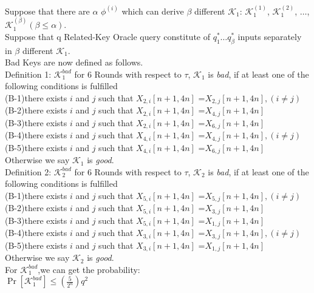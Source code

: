 \documentclass{article}
\begin{document}
Suppose that there are $\alpha$ $\phi^{(i)}$ which can derive $\beta$ different $\mathcal{K}_{1}$: $\mathcal{K}_{1}^{(1)}$, $\mathcal{K}_{1}^{(2)}$, $\dots$,$\mathcal{K}_{1}^{(\beta)}$$(\beta\leq \alpha)$.\\
Suppose that q Related-Key Oracle query constitute of $q_{1}^{\ast} \dots q_{\beta}^{\ast}$ inputs separately in $\beta$ different $\mathcal{K}_{1}$.\\

Bad Keys are now defined as follows.\\
Definition 1: $\mathcal{K}_{1}^{bad}$  for 6 Rounds
with respect to $\tau$, $\mathcal{K}_{1}$  is {\it bad}, if at least one of the following conditions is fulfilled\\
(B-1)there exists $i$ and $j$ such that $X_{2,i}[n+1,4n]$ =$X_{2,j}[n+1,4n],(i\neq j)$\\
(B-2)there exists $i$ and $j$ such that $X_{2,i}[n+1,4n]$ =$X_{4,j}[n+1,4n]$\\
(B-3)there exists $i$ and $j$ such that $X_{2,i}[n+1,4n]$ =$X_{6,j}[n+1,4n]$\\
(B-4)there exists $i$ and $j$ such that $X_{4,i}[n+1,4n]$ =$X_{4,j}[n+1,4n],(i\neq j)$\\
(B-5)there exists $i$ and $j$ such that $X_{4,i}[n+1,4n]$ =$X_{6,j}[n+1,4n]$\\
Otherwise we say $\mathcal{K}_{1}$ is {\it good}.\\

Definition 2: $\mathcal{K}_{2}^{bad}$  for 6 Rounds
with respect to $\tau$, $\mathcal{K}_{2}$  is {\it bad}, if at least one of the following conditions is fulfilled \\
(B-1)there exists $i$ and $j$ such that $X_{5,i}[n+1,4n]$ =$X_{5,j}[n+1,4n],(i\neq j)$\\
(B-2)there exists $i$ and $j$ such that $X_{5,i}[n+1,4n]$ =$X_{3,j}[n+1,4n]$\\
(B-3)there exists $i$ and $j$ such that $X_{5,i}[n+1,4n]$ =$X_{1,j}[n+1,4n]$\\
(B-4)there exists $i$ and $j$ such that $X_{3,i}[n+1,4n]$ =$X_{3,j}[n+1,4n],(i\neq j)$\\
(B-5)there exists $i$ and $j$ such that $X_{3,i}[n+1,4n]$ =$X_{1,j}[n+1,4n]$\\
Otherwise we say $\mathcal{K}_{2}$ is {\it good}.\\

For $\mathcal{K}_{1}^{bad}$,we can get the probability:\\
$\Pr[\mathcal{K}_{1}^{bad}]\leq (\frac{5}{2^{n}})q^{2}$\\
\end{document}
